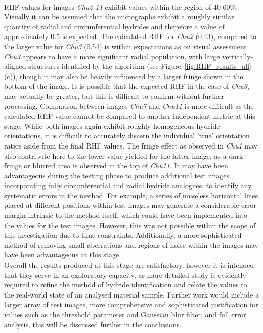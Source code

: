 \documentclass{article}
\begin{document}
    \\
    RHF values for images \textit{Chu2-11} exhibit values within the region of 40-60\%. Visually it can be assumed that the micrographs exhibit a roughly similar quantity of radial and circumferential hydrides and therefore a value of approximately 0.5 is expected. The calculated RHF for \textit{Chu2} (0.43), compared to the larger value for \textit{Chu3} (0.54) is within expectations as on visual assessment \textit{Chu3} appears to have a more significant radial population, with large vertically-aligned structures identified by the algorithm (see Figure~\ref{fig:RHF_results_all} (c)), though it may also be heavily influenced by a larger fringe shown in the bottom of the image. It is possible that the expected RHF in the case of \textit{Chu3}, may actually be greater, but this is difficult to confirm without further processing.
    Comparison between images \textit{Chu7} and \textit{Chu11} is more difficult as the calculated RHF value cannot be compared to another independent metric at this stage. While both images again exhibit roughly homogeneous hydride orientations, it is difficult to accurately discern the individual 'true' orientation ratios aside from the final RHF values. The fringe effect as observed in \textit{Chu1} may also contribute here to the lower value yielded for the latter image, as a dark fringe or blurred area is observed in the top of \textit{Chu11}.
    It may have been advantageous during the testing phase to produce additional test images incorporating fully circumferential and radial hydride analogues, to identify any systematic errors in the method. For example, a series of noiseless horizontal lines placed at different positions within test images may generate a considerable error margin intrinsic to the method itself, which could have been implemented into the values for the test images. However, this was not possible within the scope of this investigation due to time constraints. Additionally, a more sophisticated method of removing small aberrations and regions of noise within the images may have been advantageous at this stage.
    \\
    Overall the results produced at this stage are satisfactory, however it is intended that they serve in an exploratory capacity, as more detailed study is evidently required to refine the method of hydride identification and relate the values to the real-world state of an analysed material sample. Further work would include a larger array of test images, more comprehensive and sophisticated justification for values such as the threshold parameter and Gaussian blur filter, and full error analysis, this will be discussed further in the conclusions.
    
\end{document}
